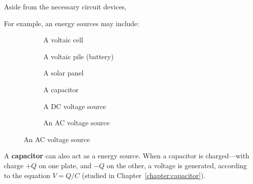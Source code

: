 Aside from the necessary circuit devices,

For example, an energy sources may include:
\begin{figure}[ht]
  \centering
  \begin{subfigure}{.32\textwidth}
    \centering
    \caption{A voltaic cell}
  \end{subfigure}
  \begin{subfigure}{.32\textwidth}
    \centering
    \caption{A voltaic pile (battery)}
  \end{subfigure}
  \begin{subfigure}{.32\textwidth}
    \centering
    \caption{A solar panel}
  \end{subfigure}

  \begin{subfigure}{.32\textwidth}
    \centering
    \caption{A capacitor}
  \end{subfigure}
  \begin{subfigure}{.32\textwidth}
    \centering
    \caption{A DC voltage source}
  \end{subfigure}
  \begin{subfigure}{.32\textwidth}
    \centering
    \caption{An AC voltage source}
  \end{subfigure}
\end{figure}

A \textbf{capacitor} can also act as a energy source. When a capacitor is
charged---with charge $+Q$ on one plate, and $-Q$ on the other, a voltage is
generated, according to the equation $V=Q/C$ (studied in
Chapter~\ref{chapter:capacitor}).

